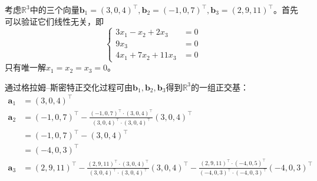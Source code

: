 \documentclass[../main.tex]{subfiles}
\begin{document}
\begin{example}
    考虑$\mathbb{R}^3$中的三个向量$\mathbf{b}_1=\left(3,0,4\right)^\intercal,\mathbf{b}_2=\left(-1,0,7\right)^\intercal,\mathbf{b}_3=\left(2,9,11\right)^\intercal$。首先可以验证它们线性无关，即
    \[
        \left\{\begin{array}{rl}
            3x_1-x_2+2x_3   & =0 \\
            9x_3            & =0 \\
            4x_1+7x_2+11x_3 & =0
        \end{array}\right.
    \]
    只有唯一解$x_1=x_2=x_3=0$。

    通过格拉姆--斯密特正交化过程可由$\mathbf{b}_1,\mathbf{b}_2,\mathbf{b}_3$得到$\mathbb{R}^3$的一组正交基：
    \begin{align*}
        \mathbf{a}_1 & =\left(3,0,4\right)^\intercal                                                                                                                                                                                                                                                                                                                                        \\
        \mathbf{a}_2 & =\left(-1,0,7\right)^\intercal-\frac{\left(-1,0,7\right)^\intercal\cdot\left(3,0,4\right)^\intercal}{\left(3,0,4\right)^\intercal\cdot\left(3,0,4\right)^\intercal}\left(3,0,4\right)^\intercal                                                                                                                                                                      \\
                     & =\left(-1,0,7\right)^\intercal-\left(3,0,4\right)^\intercal                                                                                                                                                                                                                                                                                                          \\
                     & =\left(-4,0,3\right)^\intercal                                                                                                                                                                                                                                                                                                                                       \\
        \mathbf{a}_3 & =\left(2,9,11\right)^\intercal-\frac{\left(2,9,11\right)^\intercal\cdot\left(3,0,4\right)^\intercal}{\left(3,0,4\right)^\intercal\cdot\left(3,0,4\right)^\intercal}\left(3,0,4\right)^\intercal-\frac{\left(2,9,11\right)^\intercal\cdot\left(-4,0,5\right)^\intercal}{\left(-4,0,3\right)^\intercal\cdot\left(-4,0,3\right)^\intercal}\left(-4,0,3\right)^\intercal \\

\end{align*}
\end{example}
\end{document}
